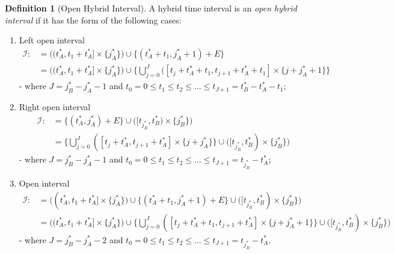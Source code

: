 \documentclass{article}
\theoremstyle{definition}
\newtheorem{definition}{Definition}[section]
\begin{document}
\begin{definition}[Open Hybrid Interval]
    A hybrid time interval is an \textit{open hybrid interval} if it has the form of the
following cases:

\begin{enumerate}

    \item Left open interval
    \begin{align}
        \mathcal{I}:&= \bigg( (t^*_A, t_1 + t^*_A] \times \{j^*_A\} \bigg) \cup 
        \bigg\{ (t^*_A + t_1,j^*_A + 1) + E\bigg\} \\
        &= \bigg( (t^*_A, t_1 +
        t^*_A] \times \{j^*_A\} \bigg) \cup 
        \bigg\{ \bigcup\limits_{j=0}^{J}
            ([t_j+t^*_A+t_1,t_{j+1}+t^*_A+t_1] \times \{j+j^*_A+1\}\bigg
            \}\nonumber 
    \end{align}
    - where $J = j^*_B - j^*_A - 1$ and $t_0 = 0 \leq t_1 \leq t_2 \leq ... \leq
    t_{J+1} = t^*_B - t^*_A - t_1$;

    \item Right open interval
    \begin{align}
        \mathcal{I}:&=  \bigg\{(t^*_A,j^*_A) + E\bigg\} \cup \bigg(
        [t_{j^*_B}, t^*_B) \times \{j^*_B\}\bigg)\\
        &= \bigg\{ \bigcup\limits_{j=0}^{J} ([t_j+t^*_A,t_{j+1}+t^*_A]
            \times \{j+j^*_A\}\bigg\} 
                         \cup \bigg(
                            [t_{j^*_B}, t^*_B) \times
                        \{j^*_B\}\bigg)\nonumber
    \end{align}
    - where $J = j^*_B - j^*_A - 1$ and $t_0 = 0 \leq t_1 \leq t_2 \leq ...
    \leq t_{J+1} = t_{j^*_B} - t^*_A$; 


    \item Open interval
     \begin{align}
        \mathcal{I} :&=  \bigg( (t^*_A, t_1 + t^*_A] \times \{j^*_A\} \bigg) \cup
        \bigg\{ (t^*_A + t_1,j^*_A + 1) + E\bigg\}
        \cup \bigg( [t_{j^*_B}, t^*_B) \times \{j^*_B\}\bigg) \\
        &=  
        \bigg( (t^*_A, t_1 + t^*_A] \times \{j^*_A\} \bigg) \cup
        \bigg\{ \bigcup\limits_{j=0}^{J} ([t_j+t^*_A+t_1,t_{j+1}+t^*_A] \times
            \{j+j^*_A+1\} \bigg\}
        \cup \bigg( [t_{j^*_B}, t^*_B) \times \{j^*_B\}\bigg) \nonumber 
     \end{align}
    - where $J = j^*_B - j^*_A -2$ and $t_0 = 0 \leq t_1 \leq t_2 \leq ...
    \leq t_{J+1} = t_{j^*_B} - t^*_A$. 


\end{enumerate}
\end{definition}
\end{document}
